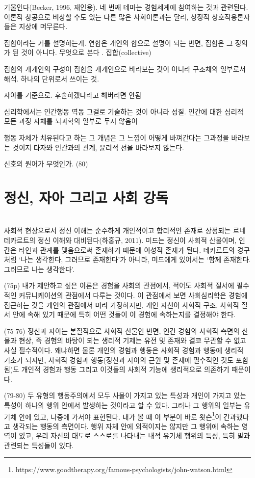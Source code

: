\documentclass[12pt, a4paper]{article}
\begin{document}
기울인다(Becker, 1996, 재인용). 네 번째 테마는 경험세계에 참여하는 것과 관련된다. 이론적 창공으로 비상할 수도 있는 다른 많은 사회이론과는 달리, 상징적 상호작용론자들은 지상에 머무른다.

집합이라는 거를 설명하는게. 연합은 개인의 합으로 설명이 되는 반면, 집합은 그 정의가 된 것이 아니다. 무엇으로 본다 . 집합(collective)

집합의 개개인의 구성이
집합을 개개인으로 바라보는 것이 아니라 구조체의 일부로서 해석. 하나의 단위로서 쓰이는 것. 

자아를 기준으로. 후술하겠다라고 해버리면 안됨

심리학에서는 인간행동 역동 그걸로 기술하는 것이 아니라 성질. 인간에 대한 심리적 모든 과정 자체를 뇌과학의 일부로 두지 않음이 

행동 자체가 치유된다고 하는 그 개념은 그 느낌이 어떻게 바껴간다는 그과정을 바라보는 것이지 타자와 인간과의 관계, 윤리적 선을 바라보지 않는다. 

신호의 원어가 무엇인가. (80)

\newpage

\section{정신, 자아 그리고 사회 강독} \\
사회적 현상으로서 정신 이해는 순수하게 개인적이고 합리적인 존재로 상정되는 르네 데카르트의 정신 이해와 대비된다(하홍규, 2011). 미드는 정신이 사회적 산물이며, 인간은 타인과 관계를 맺음으로써 존재하기 때문에 이성적 존재가 된다. 데카르트의 경구처럼 `나는 생각한다, 그러므로 존재한다'가 아니라, 미드에게 있어서는 `함께 존재한다. 그러므로 나는 생각한다'.

(75p) 내가 제안하고 싶은 이론은 경험을 사회의 관점에서, 적어도 사회적 질서에 필수적인 커뮤니케이션의 관점에서 다루는 것이다. 이 관점에서 보면 사회심리학은 경험에 접근하는 것을 개인의 관점에서 미리 가정하지만, 개인 자신이 사회적 구조, 사회적 질서 안에 속해 있기 때문에 특히 어떤 것들이 이 경험에 속하는지를 결정해야 한다.

(75-76) 정신과 자아는 본질적으로 사회적 산물인 반면, 인간 경험의 사회적 측면의 산물과 현상, 즉 경험의 바탕이 되는 생리적 기제는 유전 및 존재와 결코 무관할 수 없고 사실 필수적이다. 왜냐하면 물론 개인의 경험과 행동은 사회적 경험과 행동에 생리적 기초가 되지만, 사회적 경험과 행동(정신과 자아의 근원 및 존재에 필수적인 것도 포함됨)도 개인적 경험과 행동 그리고 이것들의 사회적 기능에 생리적으로 의존하기 때문이다.

(79-80) 두 유형의 행동주의에서 모두 사물이 가지고 있는 특성과 개인이 가지고 있는 특성이 하나의 행위 안에서 발생하는 것이라고 할 수 있다. 그러나 그 행위의 일부는 유기체 안에 있고, 나중에 가서야 표현된다. 내가 볼 때 이 부분이 바로 왓슨\footnote{https://www.goodtherapy.org/famous-psychologists/john-watson.html}이 간과했다고 생각되는 행동의 측면이다. 행위 자체 안에 외적이지는 않지만 그 행위에 속하는 영역이 있고, 우리 자신의 태도로 스스로를 나타내는 내적 유기체 행위의 특성, 특히 말과 관련되는 특성들이 있다.
\end{document}

